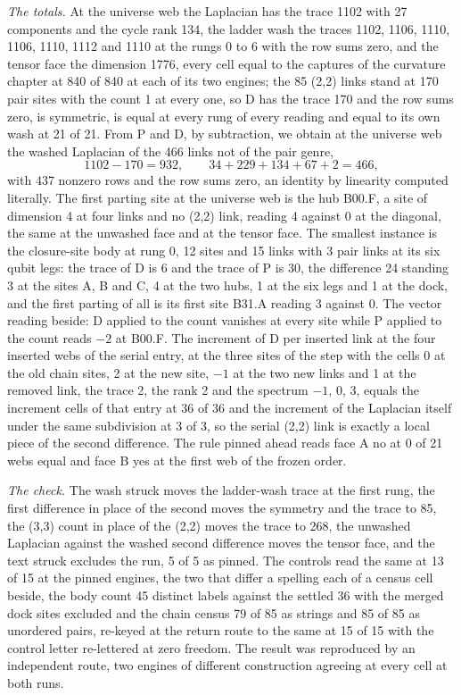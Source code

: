 \begin{chproof}
\textit{The totals.} At the universe web the Laplacian has the trace 1102 with 27 components and the cycle rank 134, the ladder wash the traces 1102, 1106, 1110, 1106, 1110, 1112 and 1110 at the rungs 0 to 6 with the row sums zero, and the tensor face the dimension 1776, every cell equal to the captures of the curvature chapter at 840 of 840 at each of its two engines; the 85 (2,2) links stand at 170 pair sites with the count 1 at every one, so D has the trace 170 and the row sums zero, is symmetric, is equal at every rung of every reading and equal to its own wash at 21 of 21. From P and D, by subtraction, we obtain at the universe web the washed Laplacian of the 466 links not of the pair genre,
\begin{equation}
1102 - 170 = 932, \qquad 34 + 229 + 134 + 67 + 2 = 466,
\end{equation}
with 437 nonzero rows and the row sums zero, an identity by linearity computed literally. The first parting site at the universe web is the hub B00.F, a site of dimension 4 at four links and no (2,2) link, reading 4 against 0 at the diagonal, the same at the unwashed face and at the tensor face. The smallest instance is the closure-site body at rung 0, 12 sites and 15 links with 3 pair links at its six qubit legs: the trace of D is 6 and the trace of P is 30, the difference 24 standing 3 at the sites A, B and C, 4 at the two hubs, 1 at the six legs and 1 at the dock, and the first parting of all is its first site B31.A reading 3 against 0. The vector reading beside: D applied to the count vanishes at every site while P applied to the count reads $-2$ at B00.F. The increment of D per inserted link at the four inserted webs of the serial entry, at the three sites of the step with the cells 0 at the old chain sites, 2 at the new site, $-1$ at the two new links and 1 at the removed link, the trace 2, the rank 2 and the spectrum $-1$, 0, 3, equals the increment cells of that entry at 36 of 36 and the increment of the Laplacian itself under the same subdivision at 3 of 3, so the serial (2,2) link is exactly a local piece of the second difference. The rule pinned ahead reads face A no at 0 of 21 webs equal and face B yes at the first web of the frozen order.

\textit{The check.} The wash struck moves the ladder-wash trace at the first rung, the first difference in place of the second moves the symmetry and the trace to 85, the (3,3) count in place of the (2,2) moves the trace to 268, the unwashed Laplacian against the washed second difference moves the tensor face, and the text struck excludes the run, 5 of 5 as pinned. The controls read the same at 13 of 15 at the pinned engines, the two that differ a spelling each of a census cell beside, the body count 45 distinct labels against the settled 36 with the merged dock sites excluded and the chain census 79 of 85 as strings and 85 of 85 as unordered pairs, re-keyed at the return route to the same at 15 of 15 with the control letter re-lettered at zero freedom. The result was reproduced by an independent route, two engines of different construction agreeing at every cell at both runs.
\end{chproof}
